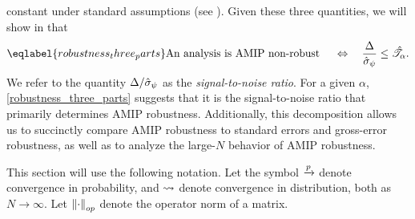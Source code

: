 constant under standard assumptions (see
).  Given these three quantities, we will
show in  that
%
\begin{align} \eqlabel{robustness_three_parts}
%
\textrm{An analysis is AMIP non-robust }\quad\Leftrightarrow\quad
\frac{\Delta}{\inflscale} \le \shape.
%
\end{align}
%
We refer to the quantity $\Delta / \hat{\sigma}_{\psi}$ as the \emph{signal-to-noise ratio}.
For a given $\alpha$, \eqref{robustness_three_parts} suggests that it is the
signal-to-noise ratio that primarily determines AMIP robustness. Additionally, this
decomposition allows us to succinctly compare AMIP robustness to standard errors
and gross-error robustness, as well as to analyze the large-$N$ behavior of
AMIP robustness.

This section will use the following notation.  Let the symbol $\xrightarrow{p}$ denote
convergence in probability, and $\rightsquigarrow$ denote convergence in
distribution, both as $N \rightarrow \infty$.  Let $\left\Vert \cdot\right\Vert_{op}$ denote
the operator norm of a matrix.
